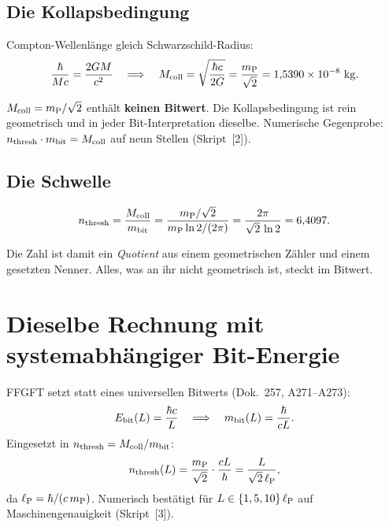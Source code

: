 \subsection{Die Kollapsbedingung}

Compton-Wellenlänge gleich Schwarzschild-Radius:
\begin{equation}
  \frac{\hbar}{Mc} = \frac{2GM}{c^2}
  \quad\Longrightarrow\quad
  M_{\mathrm{coll}} = \sqrt{\frac{\hbar c}{2G}} = \frac{m_{\mathrm{P}}}{\sqrt{2}}
         = 1{,}5390\times10^{-8}~\mathrm{kg}.
\end{equation}

\begin{tcolorbox}[proofbox, title={Der skalenunabhängige Kern \B}]
  $M_{\mathrm{coll}} = m_{\mathrm{P}}/\sqrt{2}$ enthält \textbf{keinen Bitwert}.
  Die Kollapsbedingung ist rein geometrisch und in jeder
  Bit-Interpretation dieselbe. Numerische Gegenprobe:
  $n_{\mathrm{thresh}} \cdot m_{\mathrm{bit}} = M_{\mathrm{coll}}$ auf neun Stellen (Skript~[2]).
\end{tcolorbox}

\subsection{Die Schwelle}

\begin{equation}
  n_{\mathrm{thresh}} = \frac{M_{\mathrm{coll}}}{m_{\mathrm{bit}}}
        = \frac{m_{\mathrm{P}}/\sqrt{2}}{m_{\mathrm{P}}\ln 2/(2\pi)}
        = \frac{2\pi}{\sqrt{2}\,\ln 2}
        = 6{,}4097 .
\end{equation}

Die Zahl ist damit ein \emph{Quotient} aus einem geometrischen Zähler
und einem gesetzten Nenner. Alles, was an ihr nicht geometrisch ist,
steckt im Bitwert.

\section{Dieselbe Rechnung mit systemabhängiger Bit-Energie}

FFGFT setzt statt eines universellen Bitwerts (Dok.~257, A271--A273):
\begin{equation}
  E_{\mathrm{bit}}(L) = \frac{\hbar c}{L}
  \quad\Longrightarrow\quad
  m_{\mathrm{bit}}(L) = \frac{\hbar}{cL}.
\end{equation}
Eingesetzt in $n_{\mathrm{thresh}} = M_{\mathrm{coll}}/m_{\mathrm{bit}}$:
\begin{equation}
  n_{\mathrm{thresh}}(L) = \frac{m_{\mathrm{P}}}{\sqrt{2}} \cdot \frac{cL}{\hbar}
           = \frac{L}{\sqrt{2}\,\ell_{\mathrm{P}}},
\end{equation}
da $\ell_{\mathrm{P}} = \hbar/(c\,m_{\mathrm{P}})$. Numerisch bestätigt für
$L \in \{1, 5, 10\}\,\ell_{\mathrm{P}}$ auf Maschinengenauigkeit (Skript~[3]). \B

